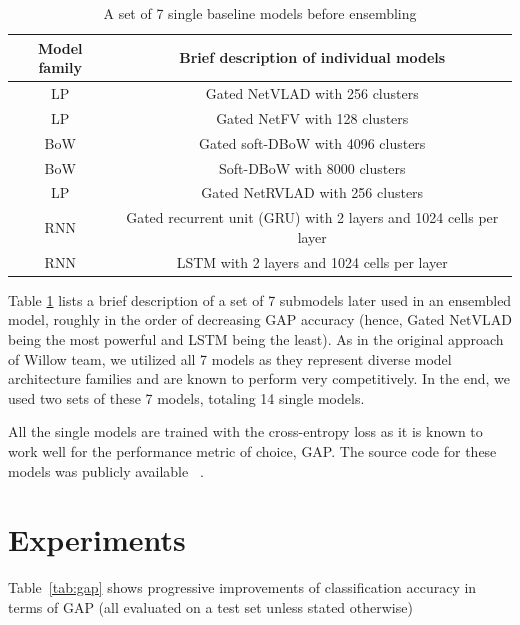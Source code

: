 \documentclass[runningheads]{llncs}
\begin{document}
\begin{table}[h!]
  \begin{center}
    \caption{A set of 7 single baseline models before ensembling}
    \label{tab:single_models}

    \begin{tabular}{ c | c }
      Model family & Brief description of individual models  \\
    \hline
    \hline
            LP & Gated NetVLAD with 256 clusters \\
    \hline
            LP & Gated NetFV with 128 clusters \\
    \hline
            BoW & Gated soft-DBoW with 4096 clusters \\
    \hline
            BoW & Soft-DBoW with 8000 clusters \\
    \hline
            LP &  Gated NetRVLAD with 256 clusters \\
    \hline
            RNN & Gated recurrent unit (GRU) with 2 layers and 1024 cells per layer \\
    \hline
            RNN & LSTM with 2 layers and 1024 cells per layer \\
    \end{tabular}
  \end{center}
\end{table}

Table \ref{tab:single_models} lists a brief description of a set of 7 submodels later used in an ensembled model, roughly in the order of decreasing GAP accuracy (hence, Gated NetVLAD being the most powerful and LSTM being the least).
As in the original approach of Willow team, we utilized all 7 models as they represent diverse model architecture families and are known to perform very competitively.
In the end, we used two sets of these 7 models, totaling 14 single models.

All the single models are trained with the cross-entropy loss as it is known to work well for the performance metric of choice, GAP.
The source code for these models was publicly available ~\cite{miech_github}.

\section{Experiments}
Table~\ref{tab:gap} shows progressive improvements of classification accuracy in terms of GAP (all evaluated on a test set unless stated otherwise)
\end{document}
